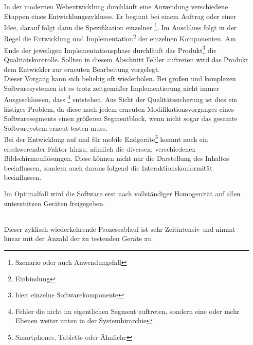 In der modernen Webentwicklung durchläuft eine Anwendung verschiedene Etappen eines Entwicklungszykluses. Er beginnt bei einem Auftrag oder einer Idee, darauf folgt dann die Spezifikation einzelner \footnote{Szenario oder auch Anwendungsfall}. Im Anschluss folgt in der Regel die Entwicklung und Implementation\footnote{Einbindung} der einzelnen Komponenten. Am Ende der jeweiligen Implementationsphase durchläuft das Produkt\footnote{hier: einzelne Softwarekomponente} die Qualitätskontrolle. Sollten in diesem Abschnitt Fehler auftreten wird das Produkt dem Entwickler zur erneuten Bearbeitung vorgelegt. 
\\
Dieser Vorgang kann sich beliebig oft wiederholen. Bei großen und komplexen Softwaresystemen ist es trotz zeitgemäßer Implementierung nicht immer Ausgeschlossen, dass \footnote{Fehler die nicht im eigentlichen Segment auftreten, sondern eine oder mehr Ebenen weiter unten in der Systemhirarchie} entstehen. Aus Sicht der Qualitätssicherung ist dies ein lästiges Problem, da diese nach jedem erneuten Modifikationsvorganges eines Softwaresegments einen größeren Segmentblock, wenn nicht sogar das gesamte Softwareystem erneut testen muss.
\\
Bei der Entwicklung auf und für mobile Endgeräte\footnote{Smartphones, Tabletts  oder Ähnliche} kommt noch ein erschwerender Faktor hinzu, nämlich die diversen, verschiedenen Bildschirmauflösungen. Diese können nicht nur die Darstellung des Inhaltes beeinflussen, sondern auch daraus folgend die Interaktionskonformität beeinflussen.


Im Optimalfall wird die Software erst nach vollständiger Homogenität auf allen unterstützen Geräten freigegeben.

\\
Dieser zyklisch wiederkehrende Prozessablauf ist sehr Zeitintensiv und nimmt linear mit der Anzahl der zu testenden Geräte zu.

